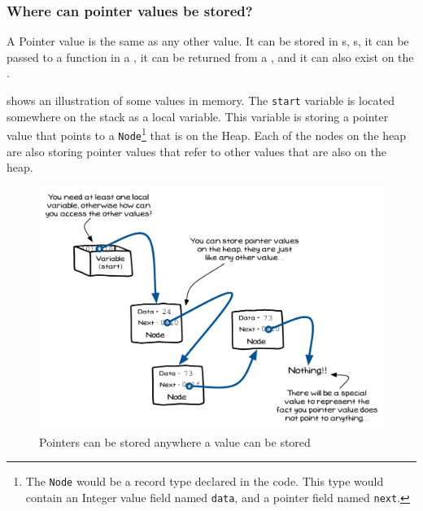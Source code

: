 
\clearpage
\subsubsection{Where can pointer values be stored?} %
\label{ssub:where_can_pointer_values_be_stored_}

A Pointer value is the same as any other value. It can be stored in s, s, it can be passed to a function in a , it can be returned from a , and it can also exist on the .

 shows an illustration of some values in memory. The \texttt{start} variable is located somewhere on the stack as a local variable.  This variable is storing a pointer value that points to a \texttt{Node}\footnote{The \texttt{Node} would be a record type declared in the code. This type would contain an Integer value field named \texttt{data}, and a pointer field named \texttt{next}.} that is on the Heap. Each of the nodes on the heap are also storing pointer values that refer to other values that are also on the heap.

\begin{figure}[h]
   \centering
   \includegraphics[width=\textwidth]{./topics/dynamic-memory/diagrams/PointerValues} 
   \caption{Pointers can be stored anywhere a value can be stored}
   \label{fig:pointer-locations}
\end{figure}



